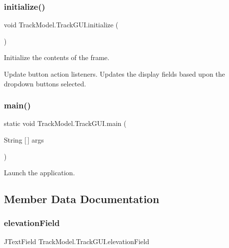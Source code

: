 \subsubsection{\texorpdfstring{initialize()}{initialize()}}
{\footnotesize\ttfamily void Track\+Model.\+Track\+G\+U\+I.\+initialize (\begin{DoxyParamCaption}{ }\end{DoxyParamCaption})\hspace{0.3cm}{\ttfamily [private]}}



Initialize the contents of the frame. 

Update button action listeners. Updates the display fields based upon the dropdown buttons selected.\mbox{\label{classTrackModel_1_1TrackGUI_ae0ea094a8dc49fd550f92a4ad64918d3}} 
\subsubsection{\texorpdfstring{main()}{main()}}
{\footnotesize\ttfamily static void Track\+Model.\+Track\+G\+U\+I.\+main (\begin{DoxyParamCaption}\item[{String \mbox{[}$\,$\mbox{]}}]{args }\end{DoxyParamCaption})\hspace{0.3cm}{\ttfamily [static]}}



Launch the application. 



\subsection{Member Data Documentation}
\mbox{\label{classTrackModel_1_1TrackGUI_a4020c45cde27dfcf04a96c1a7136ee33}} 
\subsubsection{\texorpdfstring{elevation\+Field}{elevationField}}
{\footnotesize\ttfamily J\+Text\+Field Track\+Model.\+Track\+G\+U\+I.\+elevation\+Field\hspace{0.3cm}{\ttfamily [private]}}

